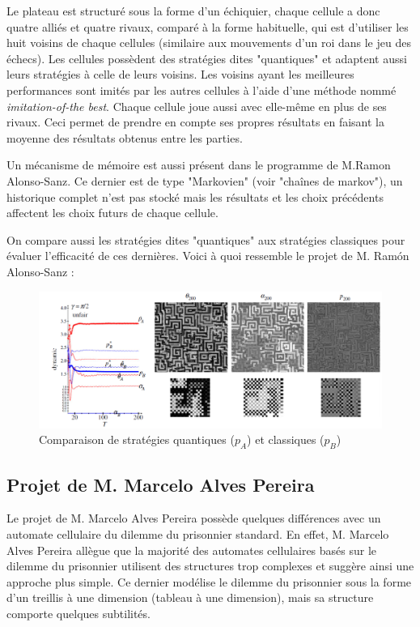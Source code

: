 \documentclass[a4paper, french]{article}
\begin{document}
Le plateau est structuré sous la forme d'un échiquier, chaque cellule a donc quatre alliés et quatre rivaux, comparé à la forme habituelle, qui est d'utiliser les huit voisins de chaque cellules (similaire aux mouvements d'un roi dans le jeu des échecs). Les cellules possèdent des stratégies dites "quantiques" et adaptent aussi leurs stratégies à celle de leurs voisins. Les voisins ayant les meilleures performances sont imités par les autres cellules à l'aide d'une méthode nommé \textit{imitation-of-the best}. Chaque cellule joue aussi avec elle-même en plus de ses rivaux. Ceci permet de prendre en compte ses propres résultats en faisant la moyenne des résultats obtenus entre les parties.

Un mécanisme de mémoire est aussi présent dans le programme de M.Ramon Alonso-Sanz. Ce dernier est de type "Markovien" (voir "chaînes de markov"), un historique complet n'est pas stocké mais les résultats et les choix précédents affectent les choix futurs de chaque cellule.

On compare aussi les stratégies dites "quantiques" aux stratégies classiques pour évaluer l'efficacité de ces dernières. Voici à quoi ressemble le projet de M. Ramón Alonso-Sanz :

\begin{figure}[htp]
    \centering
    \includegraphics[width=\linewidth]{quantum_automaton.png}
    \caption{Comparaison de stratégies quantiques ($p_A$) et classiques ($p_B$)}
\end{figure}

\pagebreak
\subsection{Projet de M. Marcelo Alves Pereira}
Le projet de M. Marcelo Alves Pereira possède quelques différences avec un automate cellulaire du dilemme du prisonnier standard. En effet, M. Marcelo Alves Pereira allègue que la majorité des automates cellulaires basés sur le dilemme du prisonnier utilisent des structures trop complexes et suggère ainsi une approche plus simple. Ce dernier modélise le dilemme du prisonnier sous la forme d'un treillis à une dimension (tableau à une dimension), mais sa structure comporte quelques subtilités.
\end{document}
